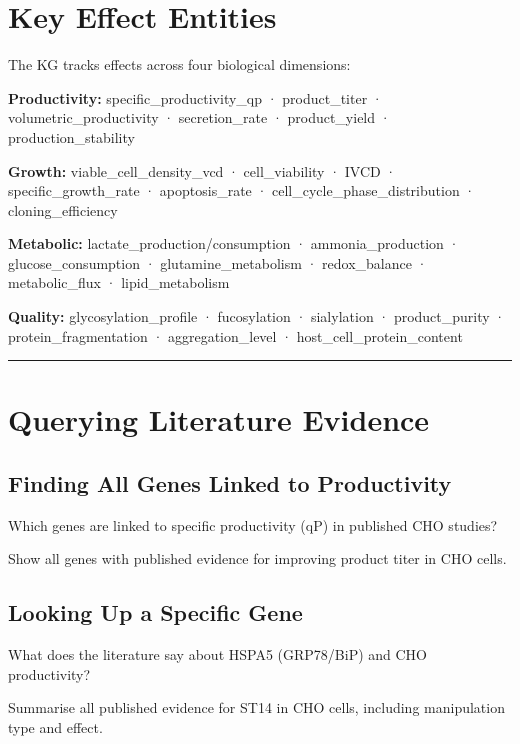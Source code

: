 \documentclass[
  letterpaper,
  oneside,
  open=any]{scrbook}
\begin{document}
\section{Key Effect Entities}\label{key-effect-entities}

The KG tracks effects across four biological dimensions:

\textbf{Productivity:} specific\_productivity\_qp · product\_titer ·
volumetric\_productivity · secretion\_rate · product\_yield ·
production\_stability

\textbf{Growth:} viable\_cell\_density\_vcd · cell\_viability · IVCD ·
specific\_growth\_rate · apoptosis\_rate ·
cell\_cycle\_phase\_distribution · cloning\_efficiency

\textbf{Metabolic:} lactate\_production/consumption ·
ammonia\_production · glucose\_consumption · glutamine\_metabolism ·
redox\_balance · metabolic\_flux · lipid\_metabolism

\textbf{Quality:} glycosylation\_profile · fucosylation · sialylation ·
product\_purity · protein\_fragmentation · aggregation\_level ·
host\_cell\_protein\_content

\begin{center}\rule{0.5\linewidth}{0.5pt}\end{center}

\section{Querying Literature
Evidence}\label{querying-literature-evidence}

\subsection{Finding All Genes Linked to
Productivity}\label{finding-all-genes-linked-to-productivity}

Which genes are linked to specific productivity (qP) in published CHO
studies?

Show all genes with published evidence for improving product titer in
CHO cells.

\subsection{Looking Up a Specific
Gene}\label{looking-up-a-specific-gene}

What does the literature say about HSPA5 (GRP78/BiP) and CHO
productivity?

Summarise all published evidence for ST14 in CHO cells, including
manipulation type and effect.
\end{document}
